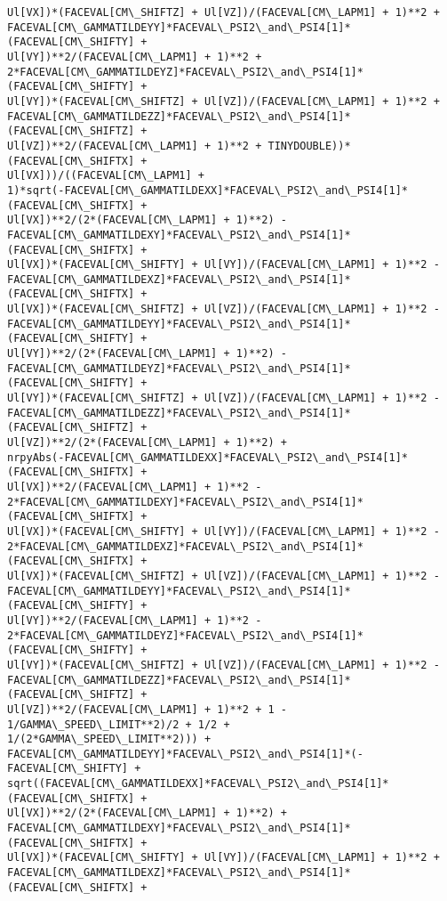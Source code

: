 \documentclass[landscape,letterpaper,10pt,english]{article}
\begin{document}
\begin{Verbatim}[commandchars=\\\{\}]
Ul[VX])*(FACEVAL[CM\_SHIFTZ] + Ul[VZ])/(FACEVAL[CM\_LAPM1] + 1)**2 +
FACEVAL[CM\_GAMMATILDEYY]*FACEVAL\_PSI2\_and\_PSI4[1]*(FACEVAL[CM\_SHIFTY] +
Ul[VY])**2/(FACEVAL[CM\_LAPM1] + 1)**2 +
2*FACEVAL[CM\_GAMMATILDEYZ]*FACEVAL\_PSI2\_and\_PSI4[1]*(FACEVAL[CM\_SHIFTY] +
Ul[VY])*(FACEVAL[CM\_SHIFTZ] + Ul[VZ])/(FACEVAL[CM\_LAPM1] + 1)**2 +
FACEVAL[CM\_GAMMATILDEZZ]*FACEVAL\_PSI2\_and\_PSI4[1]*(FACEVAL[CM\_SHIFTZ] +
Ul[VZ])**2/(FACEVAL[CM\_LAPM1] + 1)**2 + TINYDOUBLE))*(FACEVAL[CM\_SHIFTX] +
Ul[VX]))/((FACEVAL[CM\_LAPM1] +
1)*sqrt(-FACEVAL[CM\_GAMMATILDEXX]*FACEVAL\_PSI2\_and\_PSI4[1]*(FACEVAL[CM\_SHIFTX] +
Ul[VX])**2/(2*(FACEVAL[CM\_LAPM1] + 1)**2) -
FACEVAL[CM\_GAMMATILDEXY]*FACEVAL\_PSI2\_and\_PSI4[1]*(FACEVAL[CM\_SHIFTX] +
Ul[VX])*(FACEVAL[CM\_SHIFTY] + Ul[VY])/(FACEVAL[CM\_LAPM1] + 1)**2 -
FACEVAL[CM\_GAMMATILDEXZ]*FACEVAL\_PSI2\_and\_PSI4[1]*(FACEVAL[CM\_SHIFTX] +
Ul[VX])*(FACEVAL[CM\_SHIFTZ] + Ul[VZ])/(FACEVAL[CM\_LAPM1] + 1)**2 -
FACEVAL[CM\_GAMMATILDEYY]*FACEVAL\_PSI2\_and\_PSI4[1]*(FACEVAL[CM\_SHIFTY] +
Ul[VY])**2/(2*(FACEVAL[CM\_LAPM1] + 1)**2) -
FACEVAL[CM\_GAMMATILDEYZ]*FACEVAL\_PSI2\_and\_PSI4[1]*(FACEVAL[CM\_SHIFTY] +
Ul[VY])*(FACEVAL[CM\_SHIFTZ] + Ul[VZ])/(FACEVAL[CM\_LAPM1] + 1)**2 -
FACEVAL[CM\_GAMMATILDEZZ]*FACEVAL\_PSI2\_and\_PSI4[1]*(FACEVAL[CM\_SHIFTZ] +
Ul[VZ])**2/(2*(FACEVAL[CM\_LAPM1] + 1)**2) +
nrpyAbs(-FACEVAL[CM\_GAMMATILDEXX]*FACEVAL\_PSI2\_and\_PSI4[1]*(FACEVAL[CM\_SHIFTX] +
Ul[VX])**2/(FACEVAL[CM\_LAPM1] + 1)**2 -
2*FACEVAL[CM\_GAMMATILDEXY]*FACEVAL\_PSI2\_and\_PSI4[1]*(FACEVAL[CM\_SHIFTX] +
Ul[VX])*(FACEVAL[CM\_SHIFTY] + Ul[VY])/(FACEVAL[CM\_LAPM1] + 1)**2 -
2*FACEVAL[CM\_GAMMATILDEXZ]*FACEVAL\_PSI2\_and\_PSI4[1]*(FACEVAL[CM\_SHIFTX] +
Ul[VX])*(FACEVAL[CM\_SHIFTZ] + Ul[VZ])/(FACEVAL[CM\_LAPM1] + 1)**2 -
FACEVAL[CM\_GAMMATILDEYY]*FACEVAL\_PSI2\_and\_PSI4[1]*(FACEVAL[CM\_SHIFTY] +
Ul[VY])**2/(FACEVAL[CM\_LAPM1] + 1)**2 -
2*FACEVAL[CM\_GAMMATILDEYZ]*FACEVAL\_PSI2\_and\_PSI4[1]*(FACEVAL[CM\_SHIFTY] +
Ul[VY])*(FACEVAL[CM\_SHIFTZ] + Ul[VZ])/(FACEVAL[CM\_LAPM1] + 1)**2 -
FACEVAL[CM\_GAMMATILDEZZ]*FACEVAL\_PSI2\_and\_PSI4[1]*(FACEVAL[CM\_SHIFTZ] +
Ul[VZ])**2/(FACEVAL[CM\_LAPM1] + 1)**2 + 1 - 1/GAMMA\_SPEED\_LIMIT**2)/2 + 1/2 +
1/(2*GAMMA\_SPEED\_LIMIT**2))) +
FACEVAL[CM\_GAMMATILDEYY]*FACEVAL\_PSI2\_and\_PSI4[1]*(-FACEVAL[CM\_SHIFTY] +
sqrt((FACEVAL[CM\_GAMMATILDEXX]*FACEVAL\_PSI2\_and\_PSI4[1]*(FACEVAL[CM\_SHIFTX] +
Ul[VX])**2/(2*(FACEVAL[CM\_LAPM1] + 1)**2) +
FACEVAL[CM\_GAMMATILDEXY]*FACEVAL\_PSI2\_and\_PSI4[1]*(FACEVAL[CM\_SHIFTX] +
Ul[VX])*(FACEVAL[CM\_SHIFTY] + Ul[VY])/(FACEVAL[CM\_LAPM1] + 1)**2 +
FACEVAL[CM\_GAMMATILDEXZ]*FACEVAL\_PSI2\_and\_PSI4[1]*(FACEVAL[CM\_SHIFTX] +

\end{Verbatim}
\end{document}

